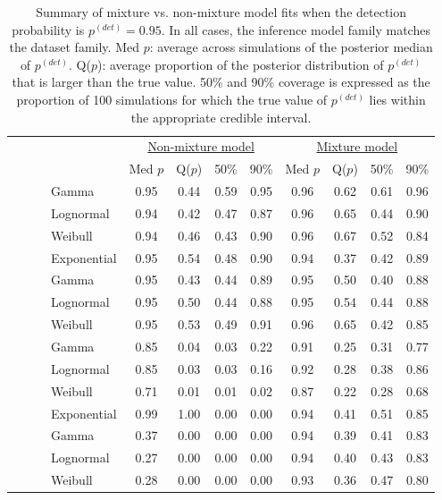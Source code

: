 \documentclass[useAMS,usenatbib,referee,12pt]{article}
\newcommand{\pdet}{p^{(det)}}
\begin{document}
\begin{table}[ht]
\begin{tabular}{l|l|l|l|cccc|cccc}
 \multicolumn{4}{c|}{ } & \multicolumn{4}{c|}{\underline{Non-mixture model}} & \multicolumn{4}{c}{\underline{Mixture model}} \\
 \multicolumn{4}{c|}{ } & Med $p$ & Q($p$) & 50\% & 90\% & Med $p$ & Q($p$) & 50\% & 90\% \\ 
  \hline
  \hline
 \parbox[t]{2mm}{} & \parbox[t]{2mm}{} & \parbox[t]{2mm}{} & Gamma & 0.95 & 0.44 & 0.59 & 0.95 & 0.96 & 0.62 & 0.61 & 0.96 \\ 
   &  &  & Lognormal & 0.94 & 0.42 & 0.47 & 0.87 & 0.96 & 0.65 & 0.44 & 0.90 \\ 
   &  &  & Weibull & 0.94 & 0.46 & 0.43 & 0.90 & 0.96 & 0.67 & 0.52 & 0.84 \\ 
   &  &  & Exponential & 0.95 & 0.54 & 0.48 & 0.90 & 0.94 & 0.37 & 0.42 & 0.89 \\ 
 & & \parbox[t]{2mm}{} & Gamma & 0.95 & 0.43 & 0.44 & 0.89 & 0.95 & 0.50 & 0.40 & 0.88 \\ 
   &  &  & Lognormal & 0.95 & 0.50 & 0.44 & 0.88 & 0.95 & 0.54 & 0.44 & 0.88 \\ 
   &  &  & Weibull & 0.95 & 0.53 & 0.49 & 0.91 & 0.96 & 0.65 & 0.42 & 0.85 \\ 
& \parbox[t]{2mm}{} & \parbox[t]{2mm}{} & Gamma & 0.85 & 0.04 & 0.03 & 0.22 & 0.91 & 0.25 & 0.31 & 0.77 \\ 
   &  &  & Lognormal & 0.85 & 0.03 & 0.03 & 0.16 & 0.92 & 0.28 & 0.38 & 0.86 \\ 
   &  &  & Weibull & 0.71 & 0.01 & 0.01 & 0.02 & 0.87 & 0.22 & 0.28 & 0.68 \\ 
   &  &  & Exponential & 0.99 & 1.00 & 0.00 & 0.00 & 0.94 & 0.41 & 0.51 & 0.85 \\ 
 & & \parbox[t]{2mm}{} & Gamma & 0.37 & 0.00 & 0.00 & 0.00 & 0.94 & 0.39 & 0.41 & 0.83 \\ 
   &  &  & Lognormal & 0.27 & 0.00 & 0.00 & 0.00 & 0.94 & 0.40 & 0.43 & 0.83 \\ 
   &  &  & Weibull & 0.28 & 0.00 & 0.00 & 0.00 & 0.93 & 0.36 & 0.47 & 0.80 \\ 
   \hline
\end{tabular}
\caption{Summary of mixture vs. non-mixture model fits when the detection probability is $\pdet =0.95$.  
In all cases, the inference model family matches the dataset family.  
Med $p$: average across simulations of the posterior median of $\pdet$.  
Q($p$): average proportion of the posterior distribution of $\pdet$ that is larger than the true value.  
50\% and 90\% coverage is expressed as the proportion of 100 simulations for which the true value of $\pdet$ lies within the appropriate credible interval.}
\end{table}
\end{document}
